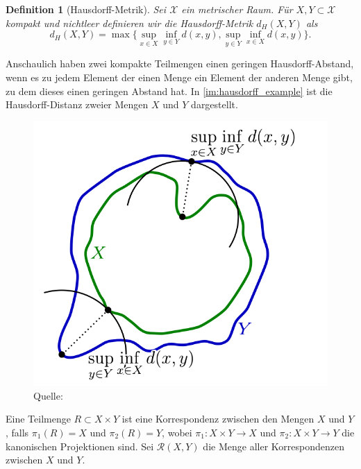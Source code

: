 \documentclass[twoside, 12pt,a4paper]{book}
\newcommand{\source}[1]{\caption*{\hfill Quelle: {#1}} }
\def\emph#1{\textit{#1}}
\newtheorem{definition}[theorem]{Definition}
\numberwithin{equation}{section}
\begin{document}
	\begin{definition}[Hausdorff-Metrik]
		Sei $\mathscr{X}$ ein metrischer Raum.
		Für  $X,Y \subset \mathscr{X}$ kompakt und nichtleer definieren wir die \emph{Hausdorff-Metrik} $d_H(X,Y)$ als
		\begin{equation}
		d_H(X,Y) = \max \lbrace \sup_{x \in X} \inf_{y \in Y} d(x,y), \sup_{y \in Y} \inf_{x \in X} d(x,y) \rbrace .
		\end{equation} 
		
	\end{definition}
	\noindent Anschaulich haben zwei kompakte Teilmengen einen geringen Hausdorff-Abstand, wenn es zu jedem Element der einen Menge ein Element der anderen Menge gibt, zu dem dieses einen geringen Abstand hat. In \autoref{im:hausdorff_example} ist die Hausdorff-Distanz zweier Mengen $X$ und $Y$ dargestellt.
	
	\begin{figure}[!ht]
		\centering
		\includegraphics[width=0.3\textheight]{Hausdorff_distance.png}
		\caption{Visualisierung der Hausdorff-Distanz zwischen den Mengen $X$ und $Y$ in $\mathbb{R}^2$.}
	
		\label{im:hausdorff_example}	
		\source{\cite{hausdorffpict}}
	\end{figure}
	
	
	\noindent Eine Teilmenge $R \subset X \times Y$ ist eine Korrespondenz zwischen den Mengen $X$ und $Y$, falls $\pi_1(R) = X$ und $\pi_2(R) = Y$, wobei $\pi_1: X \times Y \to X$ und $\pi_2: X \times Y \to Y$ die kanonischen Projektionen sind. Sei $\mathcal{R}(X,Y)$ die Menge aller Korrespondenzen zwischen $X$ und $Y$.
	
\end{document}
